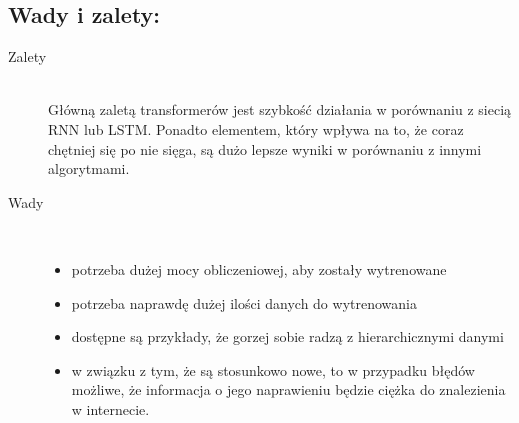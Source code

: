 \documentclass{article}
\begin{document}
\subsection{Wady i zalety:}
    \begin{description}
      \item[Zalety] \hfill \\
      Główną zaletą transformerów jest szybkość działania w porównaniu z siecią RNN lub LSTM. Ponadto elementem, który wpływa na to, że coraz chętniej się po nie sięga, są dużo lepsze wyniki w porównaniu z innymi algorytmami.
      \item[Wady] \hfill \\      
        \begin{itemize}
          \item potrzeba dużej mocy obliczeniowej, aby zostały wytrenowane
          \item potrzeba naprawdę dużej ilości danych do wytrenowania
          \item dostępne są przykłady, że gorzej sobie radzą z hierarchicznymi danymi
          \item w związku z tym, że są stosunkowo nowe, to w przypadku błędów możliwe, że informacja o jego naprawieniu będzie ciężka do znalezienia w internecie.
        \end{itemize}
    \end{description}
\newpage
\end{document}
